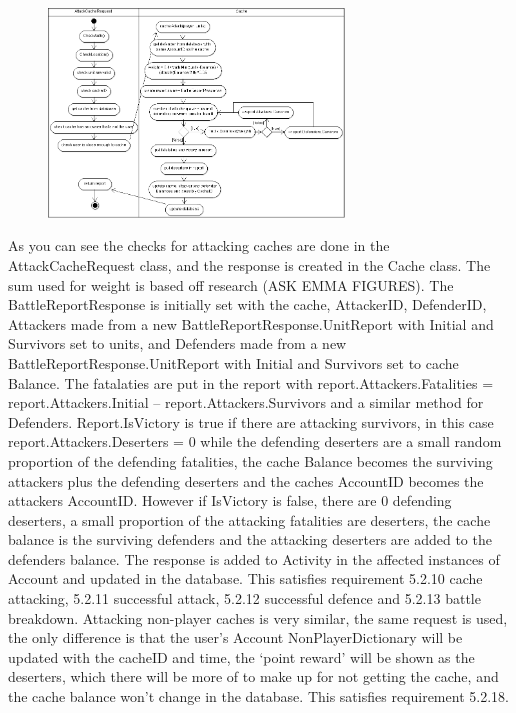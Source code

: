 \begin{figure}
    \centering
    \includegraphics[width=0.7\textwidth]{images/activity/server_attackCache}
\end{figure}

As you can see the checks for attacking caches are done in the AttackCacheRequest class, and the response is created in the Cache class. The sum used for weight is based off research (ASK EMMA FIGURES). The BattleReportResponse is initially set with the cache, AttackerID, DefenderID, Attackers made from a new BattleReportResponse.UnitReport with Initial and Survivors set to units, and Defenders made from a new BattleReportResponse.UnitReport with Initial and Survivors set to cache Balance. The fatalaties are put in the report with report.Attackers.Fatalities = report.Attackers.Initial – report.Attackers.Survivors and a similar method for Defenders. Report.IsVictory is true if there are attacking survivors, in this case report.Attackers.Deserters = 0 while the defending deserters are a small random proportion of the defending fatalities, the cache Balance becomes the surviving attackers plus the defending deserters and the caches AccountID becomes the attackers AccountID. However if IsVictory is false, there are 0 defending deserters, a small proportion of the attacking fatalities are deserters, the cache balance is the surviving defenders and the attacking deserters are added to the defenders balance. The response is added to Activity in the affected instances of Account and updated in the database. This satisfies requirement 5.2.10 cache attacking, 5.2.11 successful attack, 5.2.12 successful defence and 5.2.13 battle breakdown. Attacking non-player caches is very similar, the same request is used, the only difference is that the user's Account NonPlayerDictionary will be updated with the cacheID and time, the `point reward' will be shown as the deserters, which there will be more of to make up for not getting the cache, and the cache balance won't change in the database. This satisfies requirement 5.2.18.


